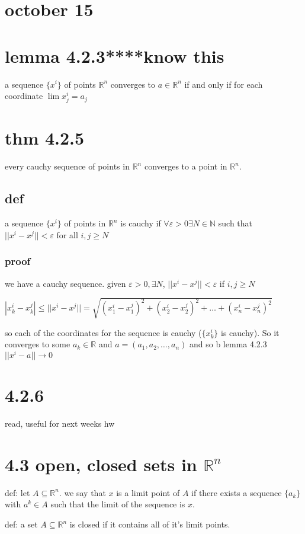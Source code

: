 \documentclass[letterpaper]{article}
\begin{document}
\section*{october 15}
\section*{lemma 4.2.3****know this}
a sequence $\{x^i\}$ of points $\mathbb{R}^n$ converges to $a\in \mathbb{R}^n$ if and only if for each coordinate $\lim x_j^i=a_j$

\section*{thm 4.2.5}
every cauchy sequence of points in $\mathbb{R}^n$ converges to a point in $\mathbb{R}^n$.
\subsection*{def}
a sequence $\{x^i\}$ of points in $\mathbb{R}^n$ is cauchy if $\forall\varepsilon>0\exists N\in \mathbb{N}$ such that $||x^i-x^j||<\varepsilon$ for all $i,j\ge N$
\subsubsection*{proof}
we have a cauchy sequence. given $\varepsilon>0, \exists N$, $||x^i-x^j||<\varepsilon$ if $i,j\ge N$

$|x_k^i-x_k^j|\le||x^i-x^j||=\sqrt{(x_1^i-x_1^j)^2+(x_2^i-x_2^j)^2+\dots+(x_n^i-x_n^j)^2}$

so each of the coordinates for the sequence is cauchy ($\{x_k^i\}$ is cauchy). So it converges to some $a_k\in\mathbb{R}$ and $a=(a_1,a_2,\dots,a_n)$ and so b lemma 4.2.3 $||x^i-a||\to 0$

\section*{4.2.6}
read, useful for next weeks hw

\section*{4.3 open, closed sets in $\mathbb{R}^n$}
def: let $A\subseteq\mathbb{R}^n$. we say that $x$ is a limit point of $A$ if there exists  a sequence $\{a_k\}$ with $a^{k}\in A$ such that the limit of the sequence is $x$.

def: a set $A\subseteq\mathbb{R}^n$ is closed if it contains all of it's limit points.
\end{document}
